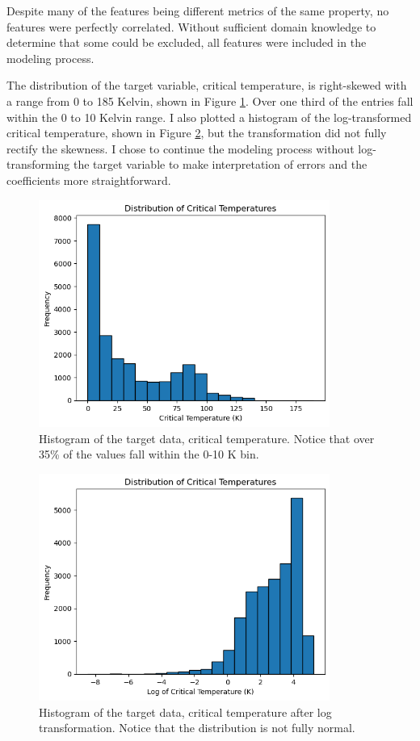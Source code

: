\documentclass{article}      %
\begin{document}
Despite many of the features being different metrics of the same property, no features were perfectly correlated. Without sufficient domain knowledge to determine that some could be excluded, all features were included in the modeling process.

The distribution of the target variable, critical temperature, is right-skewed with a range from 0 to 185 Kelvin, shown in Figure \ref{fig:critTemp_hist}. Over one third of the entries fall within the 0 to 10 Kelvin range. I also plotted a histogram of the log-transformed critical temperature, shown in Figure \ref{fig:critTempLog_hist}, but the transformation did not fully rectify the skewness. I chose to continue the modeling process without log-transforming the target variable to make interpretation of errors and the coefficients more straightforward.

\begin{figure}[h]
	\centering
	\includegraphics[width=0.85\textwidth]{figures/plt_hist_critTemp.png}
	\caption{Histogram of the target data, critical temperature. Notice that over 35\% of the values fall within the 0-10 K bin.}
	\label{fig:critTemp_hist}
\end{figure}

\begin{figure}[h]
	\centering
	\includegraphics[width=0.85\textwidth]{figures/plt_hist_critTempLog.png}
	\caption{Histogram of the target data, critical temperature after log transformation. Notice that the distribution is not fully normal.}
	\label{fig:critTempLog_hist}
\end{figure}
\end{document}
